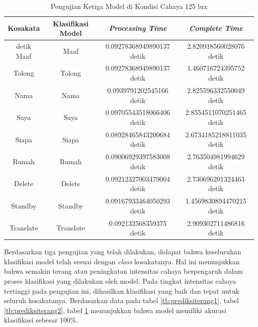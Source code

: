 \begin{longtable}{|c|c|c|c|}
  \caption{Pengujian Ketiga Model di Kondisi Cahaya 125 lux}
  \label{tb:prediksiterang3}                                   \\
  \hline
  \rowcolor[HTML]{C0C0C0}
  \textbf{Kosakata} & \textbf{Klasifikasi Model} & \textbf{\emph{Processing Time}} & \textbf{\emph{Complete Time}}\\
  \hline detik
  Maaf              & Maaf                        & 0.09278368949890137 detik                           & 2.820918560028076 detik                                  \\
  Tolong            & Tolong                      & 0.09278368949890137 detik                           & 1.460716724395752 detik                                  \\
  Nama              & Nama                        & 0.0939791202545166 detik                            & 2.825596332550049 detik                                  \\
  Saya              & Saya                        & 0.09705543518066406 detik                           & 2.8554511070251465 detik                                  \\
  Siapa             & Siapa                       & 0.08928465843200684 detik                           & 2.6734185218811035 detik                                  \\
  Rumah             & Rumah                       & 0.09006929397583008 detik                           & 2.763504981994629 detik                                 \\
  Delete            & Delete                      & 0.09212327003479004 detik                           & 2.730696201324463 detik                                 \\
  Standby           & Standby                     & 0.09167933464050293 detik                           & 1.4569830894470215 detik                                  \\
  Translate         & Translate                   & 0.092132568359375 detik                             & 2.909302711486816 detik                                 \\
  \hline
\end{longtable}

Berdasarkan tiga pengujian yang telah dilakukan, didapat bahwa keseluruhan klasifikasi model telah sesuai dengan \emph{class} kosakatanya. Hal ini menunjukkan bahwa semakin terang atau peningkatan intensitas cahaya berpengaruh dalam proses klasifikasi yang dilakukan oleh model. Pada tingkat intensitas cahaya tertinggi pada pengujian ini, dihasilkan klasifikasi yang baik dan tepat untuk seluruh kosakatanya. Berdasarkan data pada tabel \ref{tb:prediksiterang1}, tabel \ref{tb:prediksiterang2}, tabel \ref{tb:prediksiterang3} menunjukkan bahwa model memiliki akurasi klasifikasi sebesar 100\%.

